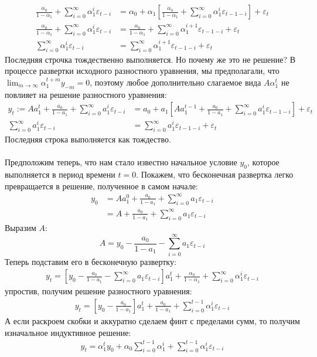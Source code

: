 \documentclass[]{article}
\begin{document}
\begin{align*}
 \frac{\alpha_0}{1 - \alpha_1} + \sum_{i=0}^{\infty}\alpha_1^i\varepsilon_{t-i} &= \alpha_0 + \alpha_1 \left[\frac{\alpha_0}{1 - \alpha_1} + \sum_{i=0}^{\infty}\alpha_1^i\varepsilon_{t-1-i} \right] + \varepsilon_t \\
 \frac{\alpha_0}{1 - \alpha_1} + \sum_{i=0}^{\infty}\alpha_1^i\varepsilon_{t-i} &=  \frac{\alpha_0}{1 - \alpha_1} + \sum_{i=0}^{\infty}\alpha_1^{i+1}\varepsilon_{t-1-i}  + \varepsilon_t \\
 \sum_{i=0}^{\infty}\alpha_1^i\varepsilon_{t-i} &= \sum_{i=0}^{\infty}\alpha_1^{i+1}\varepsilon_{t-1-i}  + \varepsilon_t
\end{align*}
Последняя строчка тождественно выполняется. Но почему же это не решение? В процессе развертки исходного разностного уравнения, мы предполагали, что $ \lim_{m\to\infty} \alpha_1^{t+m}y_{-m} = 0 $, поэтому любое дополнительно слагаемое вида $ A\alpha_1^t $ не повлияет на решение разностного уравнения:
\begin{align*}
y_t := Aa_1^t + \frac{a_0}{1-a_1} + \sum_{i=0}^{\infty}a_1^i\varepsilon_{t-i} &= a_0 + a_1\left[Aa_1^{t-1}+\frac{a_0}{1-a_1} + \sum_{i=0}^{\infty}a_1^i\varepsilon_{t-1-i}\right] + \varepsilon_t\\
\sum_{i=0}^{\infty}a_1^i\varepsilon_{t-i} &=\sum_{i=0}^{\infty}a_1^i\varepsilon_{t-1-i} +\varepsilon_t
\end{align*}
Последняя строка выполняется как тождество. \\\\
Предположим теперь, что нам стало известно начальное условие $ y_0 $, которое выполняется в период времени $ t=0 $. Покажем, что бесконечная развертка легко превращается в решение, полученное в самом начале: 
\begin{align*}
y_0 &= Aa_1^0 + \frac{a_0}{1-a_1} + \sum_{i=0}^{\infty}a_1\varepsilon_{t-i}\\
&= A + \frac{a_0}{1-a_1} + \sum_{i=0}^{\infty}a_1\varepsilon_{t-i}
\end{align*}
Выразим $ A $:
\[
	A = y_0 -  \frac{a_0}{1-a_1} - \sum_{i=0}^{\infty}a_1\varepsilon_{t-i}
\]
Теперь подставим его в бесконечную развертку:
\begin{align*}
y_t = \left[y_0 -  \frac{a_0}{1-a_1} - \sum_{i=0}^{\infty}a_1\varepsilon_{t-i}\right]a_1^t +\frac{\alpha_0}{1 - \alpha_1} + \sum_{i=0}^{\infty}\alpha_1^i\varepsilon_{t-i} 
\end{align*}
упростив, получим решение разностного уравнения:
\begin{gather*}
	\boxed{y_t = \left[ y_0 -  \frac{a_0}{1-a_1} \right] a_1^t+ \frac{a_0}{1-a_1} + \sum_{i=0}^{t-1}\alpha_1^i\varepsilon_{t-i} }
\end{gather*}
А если раскроем скобки и аккуратно сделаем финт с пределами сумм, то получим изначальное индуктивное решение:
\begin{gather*}
\boxed{	y_t = \alpha_1^ty_0 + \alpha_0\sum_{i=0}^{t-1}\alpha_1^i + \sum_{i=0}^{t-1}\alpha_1^{i}\varepsilon_{t-i}}
\end{gather*}
\end{document}
